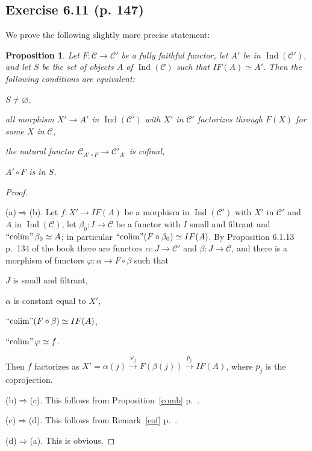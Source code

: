 \documentclass[12pt]{article}
\newtheorem{prop}[thm]{Proposition}
\theoremstyle{remark}
\theoremstyle{definition}
\newcommand{\nn}{\noindent}
\newcommand{\cc}{\mathcal}
\newcommand{\pp}{\varphi}
\newcommand{\then}{\Rightarrow}
\newcommand{\xr}{\xrightarrow}
\DeclareMathOperator*{\colim}{colim}
\DeclareMathOperator*{\ic}{``\!\colim\!"}
\DeclareMathOperator{\Ind}{Ind}
\begin{document}

\subsection{Exercise 6.11 (p. 147)} 

We prove the following slightly more precise statement:

\begin{prop}\label{myprop1}
Let $F:\cc C\to\cc C'$ be a fully faithful functor, let $A'$ be in $\Ind(\cc C')$, and let $S$ be the set of objects $A$ of $\Ind(\cc C)$ such that $IF(A)\simeq A'$. Then the following conditions are equivalent: 

\nn{\em(a)} $S\neq\varnothing$, 

\nn{\em(b)} all morphism $X'\to A'$ in $\Ind(\cc C')$ with $X'$ in $\cc C'$ factorizes through $F(X)$ for some $X$ in $\cc C$, 

\nn{\em(c)} the natural functor $\cc C_{A'\circ F}\to\cc C'_{A'}$ is cofinal, 

\nn{\em(d)} $A'\circ F$ is in $S$.
\end{prop}

\begin{proof}\ 

\nn(a)$\then$(b). Let $f:X'\to IF(A)$ be a morphism in $\Ind(\cc C')$ with $X'$ in $\cc C'$ and $A$ in $\Ind(\cc C)$, let $\beta_0:I\to\cc C$ be a functor with $I$ small and filtrant and $\ic\beta_0\simeq A$; in particular $\ic(F\circ\beta_0)\simeq IF(A)$. By Proposition 6.1.13 p.~134 of the book there are functors $\alpha:J\to\cc C'$ and $\beta:J\to\cc C$, and there is a morphism of functors $\pp:\alpha\to F\circ\beta$ such that 

$J$ is small and filtrant, 

$\alpha$ is constant equal to $X'$, 

$\ic(F\circ\beta)\simeq IF(A)$, 

$\ic\pp\simeq f$. 

\nn Then $f$ factorizes as $X'=\alpha(j)\xr{\pp_j}F(\beta(j))\xr{p_j}IF(A)$, where $p_j$ is the coprojection.

\nn(b)$\then$(c). This follows from Proposition~\ref{comb} p.~\pageref{comb}. 

\nn(c)$\then$(d). This follows from Remark~\ref{cof} p.~\pageref{cof}. 

\nn(d)$\then$(a). This is obvious.
\end{proof}

\end{document}
